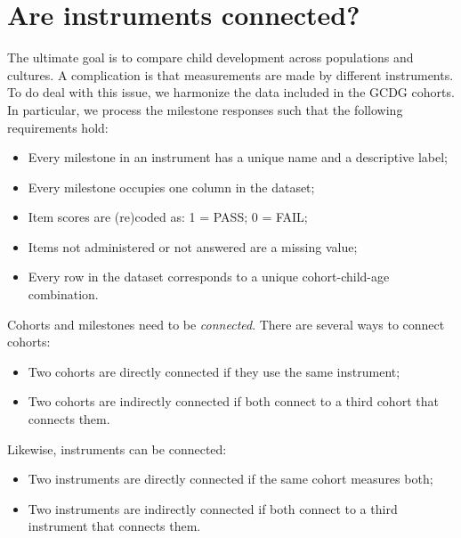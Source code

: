 \documentclass[
]{book}
\providecommand{\tightlist}{%
  \setlength{\itemsep}{0pt}\setlength{\parskip}{0pt}}
\begin{document}
\hypertarget{sec:challenge}{%
\section{Are instruments connected?}\label{sec:challenge}}

The ultimate goal is to compare child development across populations and cultures. A complication is that measurements are made by different instruments. To do deal with this issue, we harmonize the data included in the GCDG cohorts. In particular, we process the milestone responses such that the following requirements hold:

\begin{itemize}
\tightlist
\item
  Every milestone in an instrument has a unique name and a descriptive label;
\item
  Every milestone occupies one column in the dataset;
\item
  Item scores are (re)coded as: 1 = PASS; 0 = FAIL;
\item
  Items not administered or not answered are a missing value;
\item
  Every row in the dataset corresponds to a unique cohort-child-age combination.
\end{itemize}

Cohorts and milestones need to be \emph{connected}. There are several ways to connect cohorts:

\begin{itemize}
\tightlist
\item
  Two cohorts are directly connected if they use the same instrument;
\item
  Two cohorts are indirectly connected if both connect to a third cohort that connects them.
\end{itemize}

Likewise, instruments can be connected:

\begin{itemize}
\tightlist
\item
  Two instruments are directly connected if the same cohort measures both;
\item
  Two instruments are indirectly connected if both connect to a third instrument that connects them.
\end{itemize}
\end{document}

